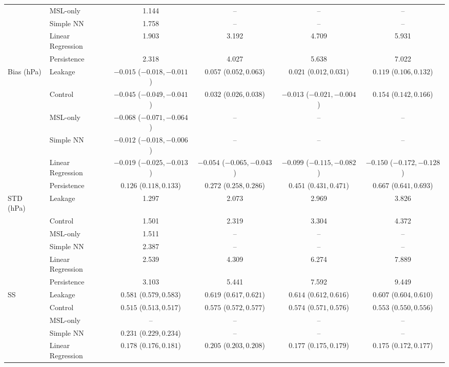\begin{table}[htbp]
{\begin{tabular}{llcccc}
 & MSL-only & 1.144 & -- & -- & -- \\
 & Simple NN & 1.758 & -- & -- & -- \\
 & Linear Regression & 1.903 & 3.192 & 4.709 & 5.931 \\
 & Persistence & 2.318 & 4.027 & 5.638 & 7.022 \\
\midrule
Bias (hPa) & Leakage & $-0.015$ ($-0.018, -0.011$) & $0.057$ ($0.052, 0.063$) & $0.021$ ($0.012, 0.031$) & $0.119$ ($0.106, 0.132$) \\
 & Control & $-0.045$ ($-0.049, -0.041$) & $0.032$ ($0.026, 0.038$) & $-0.013$ ($-0.021, -0.004$) & $0.154$ ($0.142, 0.166$) \\
 & MSL-only & $-0.068$ ($-0.071, -0.064$) & -- & -- & -- \\
 & Simple NN & $-0.012$ ($-0.018, -0.006$) & -- & -- & -- \\
 & Linear Regression & $-0.019$ ($-0.025, -0.013$) & $-0.054$ ($-0.065, -0.043$) & $-0.099$ ($-0.115, -0.082$) & $-0.150$ ($-0.172, -0.128$) \\
 & Persistence & $0.126$ ($0.118, 0.133$) & $0.272$ ($0.258, 0.286$) & $0.451$ ($0.431, 0.471$) & $0.667$ ($0.641, 0.693$) \\
\midrule
STD (hPa) & Leakage & 1.297 & 2.073 & 2.969 & 3.826 \\
 & Control & 1.501 & 2.319 & 3.304 & 4.372 \\
 & MSL-only & 1.511 & -- & -- & -- \\
 & Simple NN & 2.387 & -- & -- & -- \\
 & Linear Regression & 2.539 & 4.309 & 6.274 & 7.889 \\
 & Persistence & 3.103 & 5.441 & 7.592 & 9.449 \\
\midrule
SS & Leakage & $0.581$ ($0.579, 0.583$) & $0.619$ ($0.617, 0.621$) & $0.614$ ($0.612, 0.616$) & $0.607$ ($0.604, 0.610$) \\
 & Control & $0.515$ ($0.513, 0.517$) & $0.575$ ($0.572, 0.577$) & $0.574$ ($0.571, 0.576$) & $0.553$ ($0.550, 0.556$) \\
 & MSL-only & -- & -- & -- & -- \\
 & Simple NN & $0.231$ ($0.229, 0.234$) & -- & -- & -- \\
 & Linear Regression & $0.178$ ($0.176, 0.181$) & $0.205$ ($0.203, 0.208$) & $0.177$ ($0.175, 0.179$) & $0.175$ ($0.172, 0.177$) \\


\end{tabular}}
\end{table}
